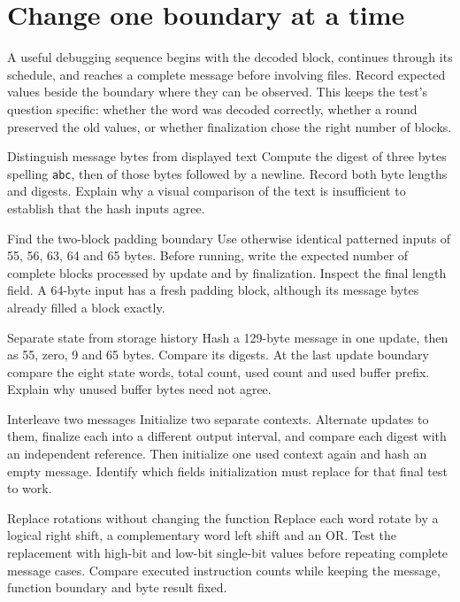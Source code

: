 \section{Change one boundary at a time}
A useful debugging sequence begins with the decoded block, continues through its
schedule, and reaches a complete message before involving files. Record expected
values beside the boundary where they can be observed. This keeps the test's question
specific: whether the word was decoded correctly, whether a round preserved the old
values, or whether finalization chose the right number of blocks.

\begin{MARSExercise}{Distinguish message bytes from displayed text}
  Compute the digest of three bytes spelling \texttt{abc}, then of those bytes followed
  by a newline. Record both byte lengths and digests. Explain why a visual comparison of
  the text is insufficient to establish that the hash inputs agree.
\end{MARSExercise}

\begin{MARSExercise}{Find the two-block padding boundary}
  Use otherwise identical patterned inputs of 55, 56, 63, 64 and 65 bytes. Before running,
  write the expected number of complete blocks processed by update and by finalization.
  Inspect the final length field. A 64-byte input has a fresh padding block, although
  its message bytes already filled a block exactly.
\end{MARSExercise}

\begin{MARSExercise}{Separate state from storage history}
  Hash a 129-byte message in one update, then as 55, zero, 9 and 65 bytes. Compare its
  digests. At the last update boundary compare the eight state words, total count, used
  count and used buffer prefix. Explain why unused buffer bytes need not agree.
\end{MARSExercise}

\begin{MARSExercise}{Interleave two messages}
  Initialize two separate contexts. Alternate updates to them, finalize each into a
  different output interval, and compare each digest with an independent reference.
  Then initialize one used context again and hash an empty message. Identify which
  fields initialization must replace for that final test to work.
\end{MARSExercise}

\begin{MARSExercise}{Replace rotations without changing the function}
  Replace each word rotate by a logical right shift, a complementary word left shift
  and an OR. Test the replacement with high-bit and low-bit single-bit values before
  repeating complete message cases. Compare executed instruction counts while keeping
  the message, function boundary and byte result fixed.
\end{MARSExercise}

